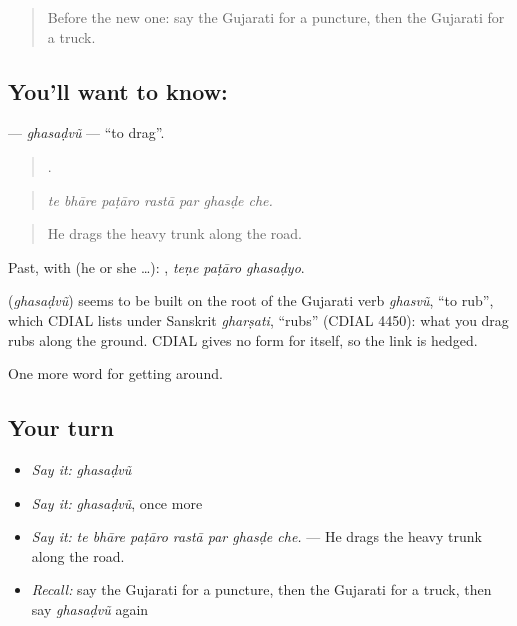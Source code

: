 \begin{quote}
Before the new one: say the Gujarati for a puncture, then the Gujarati for a truck.
\end{quote}

\subsection*{You'll want to know: }
\textbf{} — \emph{ghasaḍvũ} — \textquotedblleft{}to drag\textquotedblright{}.

\begin{quote}
      .
\end{quote}

\begin{quote}
\emph{te bhāre paṭāro rastā par ghasḍe che.}
\end{quote}

\begin{quote}
He drags the heavy trunk along the road.
\end{quote}

Past, with  (he or she …):   , \emph{teṇe paṭāro ghasaḍyo}.

\begin{cousinweb}
\textbf{} (\emph{ghasaḍvũ}) seems to be built on the root of the Gujarati verb \emph{ghasvũ}, \textquotedblleft{}to rub\textquotedblright{}, which CDIAL lists under Sanskrit \emph{gharṣati}, \textquotedblleft{}rubs\textquotedblright{} (CDIAL 4450): what you drag rubs along the ground. CDIAL gives no form for  itself, so the link is hedged.
\end{cousinweb}

\begin{grammarlens}[title={What you've built}]
One more word for getting around.
\end{grammarlens}

\subsection*{Your turn}
\begin{itemize}
\raggedright
  \item \emph{Say it:} \emph{ghasaḍvũ}
  \item \emph{Say it:} \emph{ghasaḍvũ}, once more
  \item \emph{Say it:} \emph{te bhāre paṭāro rastā par ghasḍe che.} — He drags the heavy trunk along the road.
  \item \emph{Recall:} say the Gujarati for a puncture, then the Gujarati for a truck, then say \emph{ghasaḍvũ} again
\end{itemize}

